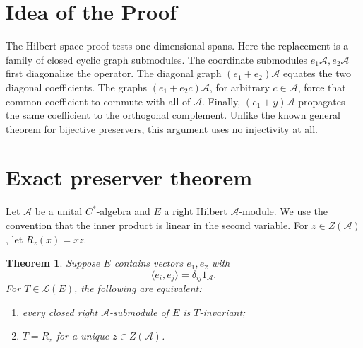 \documentclass[11pt]{article}
\newtheorem{theorem}{Theorem}
\newcommand{\A}{\mathcal A}
\newcommand{\Ladj}{\mathcal L}
\begin{document}
\section{Idea of the Proof}

The Hilbert-space proof tests one-dimensional spans.  Here the replacement is
a family of closed cyclic graph submodules.  The coordinate submodules
$e_1\A,e_2\A$ first diagonalize the operator.  The diagonal graph
$(e_1+e_2)\A$ equates the two diagonal coefficients.  The graphs
$(e_1+e_2c)\A$, for arbitrary $c\in\A$, force that common coefficient to
commute with all of $\A$.  Finally, $(e_1+y)\A$ propagates the same
coefficient to the orthogonal complement.  Unlike the known general theorem
for bijective preservers, this argument uses no injectivity at all.

\section{Exact preserver theorem}

Let $\A$ be a unital $C^*$-algebra and $E$ a right Hilbert $\A$-module.  We
use the convention that the inner product is linear in the second variable.
For $z\in Z(\A)$, let $R_z(x)=xz$.

\begin{theorem}\label{thm:main}
Suppose $E$ contains vectors $e_1,e_2$ with
\[
 \langle e_i,e_j\rangle=\delta_{ij}1_{\A}.
\]
For $T\in\Ladj(E)$, the following are equivalent:
\begin{enumerate}
 \item every closed right $\A$-submodule of $E$ is $T$-invariant;
 \item $T=R_z$ for a unique $z\in Z(\A)$.
\end{enumerate}
\end{theorem}
\end{document}
